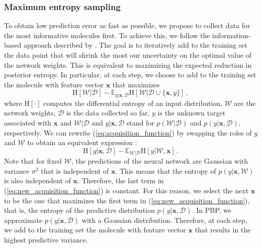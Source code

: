 \subsubsection{Maximum entropy sampling}

To obtain low prediction error as fast as possible, we propose to collect data for the most informative molecules first. To achieve this, we follow the information-based approach described by \cite{MacKay_1992}. The goal is to iteratively add to the training set the data point that will shrink the most our uncertainty on the optimal value of the network weights. This is equivalent to maximizing the expected reduction in posterior entropy. In particular, at each step, we choose to add to the training set the molecule with feature vector $\mathbf{x}$ that maximizes
\begin{equation}
\text{H}[\mathcal{W}|\mathcal{D}]  - 
\mathbb{E}_{y|\mathbf{x},\mathcal{D}}\text{H}[\mathcal{W}|\mathcal{D}\cup\{\mathbf{x},y\}]\,,\label{eq:acquisition_function}
\end{equation}
where $\text{H}[\cdot]$ computes the differential entropy of an input distribution, $\mathcal{W}$ are the network weights, $\mathcal{D}$ is the data collected so far, $y$ is the unknown target associated with $\mathbf{x}$ and $\mathcal{W}|\mathcal{D}$ and $y|\mathbf{x},\mathcal{D}$ stand for $p(\mathcal{W}|\mathcal{D})$ and $p(y|\mathbf{x},\mathcal{D})$, respectively. We can rewrite (\ref{eq:acquisition_function}) by swapping the roles of $y$ and $\mathcal{W}$ to obtain an equivalent expression \cite{houlsby2012collaborative}:
\begin{equation}
\text{H}[y | \mathbf{x},\mathcal{D}] - 
\mathbb{E}_{\mathcal{W} | \mathcal{D}}\text{H}[y | \mathcal{W},\mathbf{x}]\,.\label{eq:new_acquisition_function}
\end{equation}
Note that for fixed $\mathcal{W}$, the predictions of the neural network are Gaussian with variance $\sigma^2$ that is independent of $\mathbf{x}$. This means that the entropy of $p(y| \mathbf{x},\mathcal{W})$ is also independent of $\mathbf{x}$.
Therefore, the last term in (\ref{eq:new_acquisition_function}) is constant.
For this reason, we select the next $\mathbf{x}$ to be the one that maximizes the first term in (\ref{eq:new_acquisition_function}), that is,
the entropy of the predictive distribution $p(y| \mathbf{x},\mathcal{D})$. In PBP, we approximate $p(y| \mathbf{x},\mathcal{D})$ with a Gaussian distribution. Therefore, 
at each step, we add to the training set the molecule with feature vector $\mathbf{x}$ that results in the highest predictive variance.

